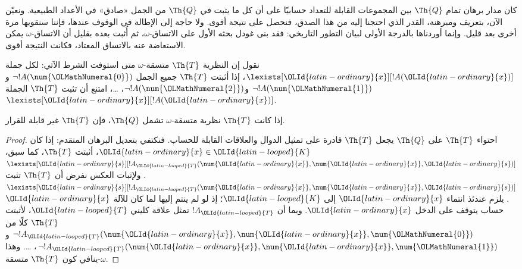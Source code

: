 \documentclass[../../../include/open-logic-section]{subfiles}
\begin{document}


\begin{explain}
كان مدار برهان تمام $\Th{Q}$ بين المجموعات القابلة للتعداد حسابيًا
على أن كل ما يثبت في $\Th{Q}$ من الجمل «صادق» في الأعداد الطبيعية.
ونعيّن الآن، بتعريف ومبرهنة، القدر الذي احتجنا إليه من هذا الصدق،
فنحصل على نتيجة أقوى. ولا حاجة إلى الإطالة في الوقوف عندها، فإننا
سنقويها مرة أخرى بعد قليل. وإنما أوردناها بالدرجة الأولى لبيان
التطور التاريخي: فقد بنى غودل بحثه الأول على الاتساق-$\omega$،
ثم أُثبت بعده بقليل أن الاتساق-$\omega$ يمكن الاستعاضة عنه بالاتساق
المعتاد، فكانت النتيجة أقوى.
\end{explain}

\begin{defn}
نقول إن النظرية $\Th{T}$ متسقة-$\omega$ متى استوفت الشرط الآتي:
لكل جملة $\lexists[{\OLId{latin-ordinary}{x}}][!A({\OLId{latin-ordinary}{x}})]$، إذا أثبتت $\Th{T}$ جميع الجمل
$\lnot !A(\num {\OLMathNumeral{0}})$ و$\lnot !A(\num {\OLMathNumeral{1}})$ و$\lnot !A(\num {\OLMathNumeral{2}})$،
\dots، امتنع أن تثبت $\Th{T}$ الجملة $\lexists[{\OLId{latin-ordinary}{x}}][!A({\OLId{latin-ordinary}{x}})]$.
\end{defn}

\begin{thm}
  إذا كانت $\Th{T}$ نظرية متسقة-$\omega$ تشمل $\Th{Q}$،
  فإن $\Th{T}$ غير قابلة للقرار.
\end{thm}

\begin{proof}
احتواء $\Th{T}$ على $\Th{Q}$ يجعل $\Th{T}$ قادرة على تمثيل الدوال
والعلاقات القابلة للحساب. فنكتفي بتعديل البرهان المتقدم:
إذا كان ${\OLId{latin-ordinary}{x}}\in {\OLId{latin-looped}{K}}$، أثبتت $\Th{T}$، كما سبق،
$\lexists[{\OLId{latin-ordinary}{s}}][!A_{\OLId{latin-looped}{T}}(\num {\OLId{latin-ordinary}{x}},\num {\OLId{latin-ordinary}{x}},{\OLId{latin-ordinary}{s}})]$. ولإثبات العكس نفرض أن
$\Th{T}$ تثبت $\lexists[{\OLId{latin-ordinary}{s}}][!A_{\OLId{latin-looped}{T}}(\num {\OLId{latin-ordinary}{x}},\num {\OLId{latin-ordinary}{x}},{\OLId{latin-ordinary}{s}})]$.
يلزم عندئذ انتماء ${\OLId{latin-ordinary}{x}}$ إلى ${\OLId{latin-looped}{K}}$؛ إذ لو لم ينتم إليها لما كان للآلة
${\OLId{latin-ordinary}{x}}$ حساب يتوقف على الدخل ${\OLId{latin-ordinary}{x}}$. وبما أن $!A_{\OLId{latin-looped}{T}}$ تمثل علاقة كليني ${\OLId{latin-looped}{T}}$،
لأثبتت $\Th{T}$ كلًا من
$\lnot !A_{\OLId{latin-looped}{T}}(\num {\OLId{latin-ordinary}{x}},\num {\OLId{latin-ordinary}{x}},\num {\OLMathNumeral{0}})$ و
$\lnot !A_{\OLId{latin-looped}{T}}(\num {\OLId{latin-ordinary}{x}},\num {\OLId{latin-ordinary}{x}},\num {\OLMathNumeral{1}})$، \dots. وهذا ينافي كون
$\Th{T}$ متسقة-$\omega$.
\end{proof}
\end{document}
